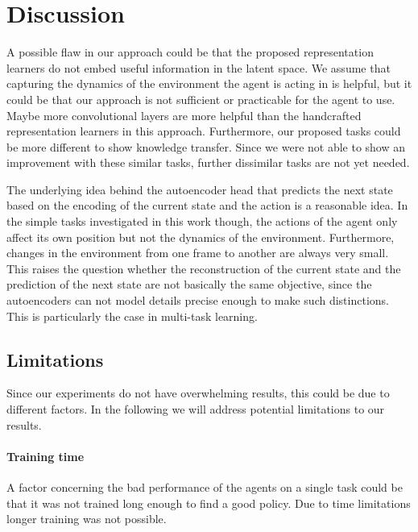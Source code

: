 \section{Discussion}
\label{sec:discussion}


A possible flaw in our approach could be that the proposed representation learners do not embed useful information in the latent space. We assume that capturing the dynamics of the environment the agent is acting in is helpful, but it could be that our approach is not sufficient or practicable for the agent to use. Maybe more convolutional layers are more helpful than the handcrafted representation learners in this approach.
Furthermore, our proposed tasks could be more different to show knowledge transfer. Since we were not able to show an improvement with these similar tasks, further dissimilar tasks are not yet needed.

The underlying idea behind the autoencoder head that predicts the next state based on the encoding of the current state and the action is a reasonable idea. In the simple tasks investigated in this work though, the actions of the agent only affect its own position but not the dynamics of the environment. Furthermore, changes in the environment from one frame to another are always very small. This raises the question whether the reconstruction of the current state and the prediction of the next state are not basically the same objective, since the autoencoders can not model details precise enough to make such distinctions. This is particularly the case in multi-task learning.



\subsection{Limitations}
Since our experiments do not have overwhelming results, this could be due to different factors. In the following we will address potential limitations to our results.

\paragraph{Training time} A factor concerning the bad performance of the agents on a single task could be that it was not trained long enough to find a good policy. Due to time limitations longer training was not possible.

